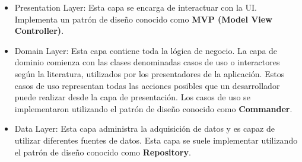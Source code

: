 \begin{itemize}
	\item Presentation Layer: Esta capa se encarga de interactuar con la UI. Implementa un patrón de diseño conocido como \textbf{MVP (Model View Controller)}. 
	\item Domain Layer: Esta capa contiene toda la lógica de negocio. La capa de dominio comienza con las clases denominadas casos de uso o interactores según la literatura, utilizados por los presentadores de la aplicación. Estos casos de uso representan todas las acciones posibles que un desarrollador puede realizar desde la capa de presentación. Los casos de uso se implementaron utilizando el patrón de diseño conocido como \textbf{Commander}.
	\item Data Layer: Esta capa administra la adquisición de datos y es capaz de utilizar diferentes fuentes de datos. Esta capa se suele implementar utilizando el patrón de diseño conocido como \textbf{Repository}.  
\end{itemize}

